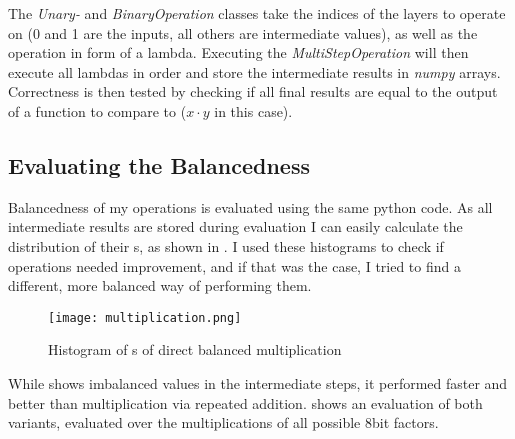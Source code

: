 The \emph{Unary-} and \emph{BinaryOperation} classes take the indices of the layers to operate on (0 and 1 are the inputs, all others are intermediate values), as well as the operation in form of a lambda.
Executing the \emph{MultiStepOperation} will then execute all lambdas in order and store the intermediate results in \emph{numpy} arrays.
Correctness is then tested by checking if all final results are equal to the output of a function to compare to ($x \cdot y$ in this case).





\subsection{Evaluating the Balancedness}
\label{balance-eval}
Balancedness of my operations is evaluated using the same python code.
As all intermediate results are stored during evaluation I can easily calculate the distribution of their \hammingw s, as shown in .
I used these histograms to check if operations needed improvement, and if that was the case, I tried to find a different, more balanced way of performing them.

\begin{figure}[h]
  \centering
  \texttt{[image: multiplication.png]}
  \caption{Histogram of \hammingw s of direct balanced multiplication}
  \label{fig:mult}
\end{figure}

While  shows imbalanced values in the intermediate steps, it performed faster and better than multiplication via repeated addition.
 shows an evaluation of both variants, evaluated over the multiplications of all possible 8bit factors.

